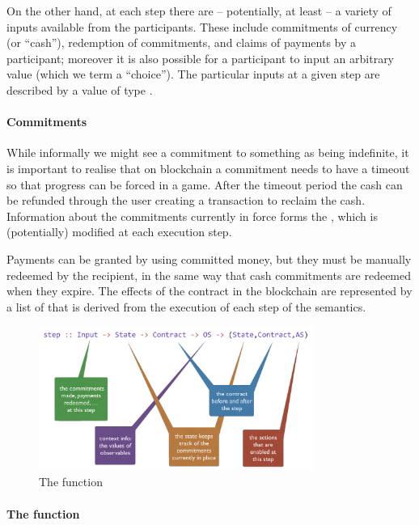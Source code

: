\documentclass[
      acmsmall
    , screen
  ]{acmart}
\begin{document}
On the other hand, at each step there are -- potentially, at least -- a variety of inputs available from the participants. These include commitments of currency (or ``cash''), redemption of commitments, and claims of payments by a participant; moreover it is also possible for a participant to input an arbitrary value (which we term a ``choice''). The particular inputs at a given step are described by a value of type .

\paragraph{Commitments}


While informally we might see a commitment to something as being indefinite, it is important to realise that on blockchain a commitment needs to have a timeout so that progress can be forced in a game. After the timeout period the cash can be refunded through the user creating a transaction to reclaim the cash.
Information about the commitments currently in force forms the , which is (potentially) modified at each execution step. 

Payments can be granted by using committed money, but they must be manually redeemed by the recipient, in the 
same way that cash commitments are redeemed when they expire. The effects of the contract in the blockchain are 
represented by a list  of  that is derived from the execution of each step of the semantics.

\begin{figure}[t]
\begin{center}
\includegraphics[width=0.8\textwidth]{pix/step-type.png}
\caption{The  function}
\label{fig:step-function}
\end{center}
\end{figure}

\paragraph{The  function}
\end{document}
